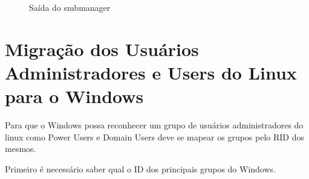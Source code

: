 \begin{figure}[ht]
   	\centering
   	\caption{Saída do smbmanager}
    \label{smbmanager}
\end{figure}

\section{Migração dos Usuários Administradores e Users do Linux para o Windows}

Para que o Windows possa reconhecer um grupo de usuários administradores do linux como Power Users e Domain Users deve se mapear os grupos pelo RID dos mesmos.

Primeiro é necessário saber qual o ID dos principais grupos do Windows.

